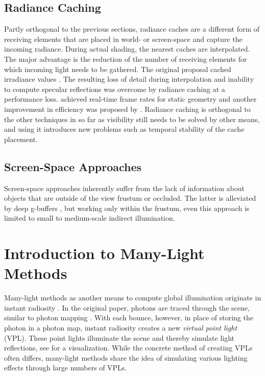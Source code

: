 \subsection{Radiance Caching}

Partly orthogonal to the previous sections, radiance caches are a different form of receiving elements that are placed in world- or screen-space and capture the incoming radiance. During actual shading, the nearest caches are interpolated. The major advantage is the reduction of the number of receiving elements for which incoming light needs to be gathered.
The original proposal cached irradiance values \citep{Ward:1988:IrradianceCaching}. The resulting loss of detail during interpolation and inability to compute specular reflections was overcome by radiance caching \citep{Krivanek:2005:RadianceCaching} at a performance loss. \citet{Scherzer:2012:PreconvolvedRadianceCaching} achieved real-time frame rates for static geometry and another improvement in efficiency was proposed by \citet{Rehfeld:2014:ClusteredPreconvolvedRadianceCaching}.
Radiance caching is orthogonal to the other techniques in so far as visibility still needs to be solved by other means, and using it introduces new problems such as temporal stability of the cache placement.


\subsection{Screen-Space Approaches}

Screen-space approaches inherently suffer from the lack of information about objects that are outside of the view frustum or occluded. The latter is alleviated by deep g-buffers \citep{Mara:2014:DeepGBuffers, Mara:2016:DeepGBuffers2}, but working only within the frustum, even this approach is limited to small to medium-scale indirect illumination.



\section{Introduction to Many-Light Methods}


Many-light methods as another means to compute global illumination originate in instant radiosity \citep{Keller:1997:InstantRadiosity}. In the original paper, photons are traced through the scene, similar to photon mapping \citep{Jensen:1996:PhotonMapping}. With each bounce, however, in place of storing the photon in a photon map, instant radiosity creates a new \emph{virtual point light} (VPL). These point lights illuminate the scene and thereby simulate light reflections, see  for a visualization. While the concrete method of creating VPLs often differs, many-light methods share the idea of simulating various lighting effects through large numbers of VPLs.

